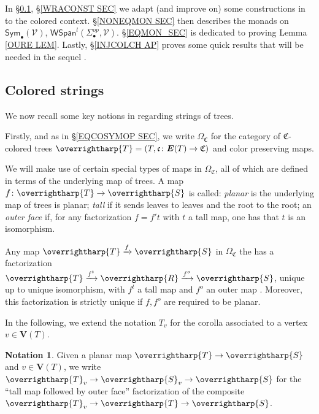 \documentclass[a4paper,10pt
]{article}%
\numberwithin{equation}{section}
\numberwithin{figure}{section}
\theoremstyle{definition} %
\newtheorem{notation}[equation]{Notation}%
\newcommand{\vect}[1]{\text{\overrightharp{\ensuremath{#1}}}}
\newcommand{\V}{\ensuremath{\mathcal V}}
\newcommand{\1}{\ensuremath{\mathbbm 1}}%
\begin{document}
In \S \ref{CSTRINGS_SEC}, \S \ref{WRACONST SEC}
we adapt (and improve on) 
some constructions in \cite{BP21}
to the colored context.
%
\S \ref{NONEQMON SEC} then describes the monads on
$\mathsf{Sym}_{\bullet}(\V)$, $\mathsf{WSpan}^l(\Sigma_{\bullet}^{op},\mathcal{V})$.
%
\S \ref{EQMON_SEC} is dedicated to proving Lemma \ref{OURE LEM}.
Lastly,
\S \ref{INJCOLCH AP}
proves some quick results that 
will be needed in the sequel \cite{BP_ACOP}.





\subsection{Colored strings}
\label{CSTRINGS_SEC}


We now recall some key notions in \cite{BP21}
regarding strings of trees.

Firstly, and as in \S \ref{EQCOSYMOP SEC},
we write 
$\Omega_{\mathfrak{C}}$
for the category of 
$\mathfrak{C}$-colored trees
$\vect{T} = (T,\mathfrak{c}\colon \boldsymbol{E}(T) \to \mathfrak{C})$
and color preserving maps.

We will make use of certain special types of maps in $\Omega_{\mathfrak{C}}$, all of which are defined in terms of the underlying map of trees.
A map $f \colon \vect{T} \to \vect{S}$
is called:
\emph{planar} is the underlying map of trees is planar;
\emph{tall} if it sends leaves to leaves and the root to the root;
an \emph{outer face}
if, for any factorization 
$f = f' t$ with $t$ a tall map, one has that $t$ is an isomorphism. 

Any map $\vect{T} \xrightarrow{f} \vect{S}$ in $\Omega_{\mathfrak{C}}$
the has a factorization
$\vect{T} \xrightarrow{f^t} \vect{R} \xrightarrow{f^o} \vect{S}$,
unique up to unique isomorphism,
with $f^t$ a tall map and $f^o$ an outer map
\cite[Prop. 3.36]{BP21}.
Moreover, this factorization is strictly unique if $f,f^o$ are required to be planar.

In the following,
we extend the notation $T_v$ for the corolla associated to a vertex 
$v \in \boldsymbol{V}(T)$.


\begin{notation}\label{SVNOT NOT}
	Given a planar map $\vect{T} \to \vect{S}$
	and $v \in \boldsymbol{V}(T)$,
	we write
	$\vect{T}_v \to \vect{S}_v \to \vect{S}$
	for the ``tall map followed by outer face''
	factorization of the composite
	$\vect{T}_v \to \vect{T} \to \vect{S}$.
\end{notation}
\end{document}
